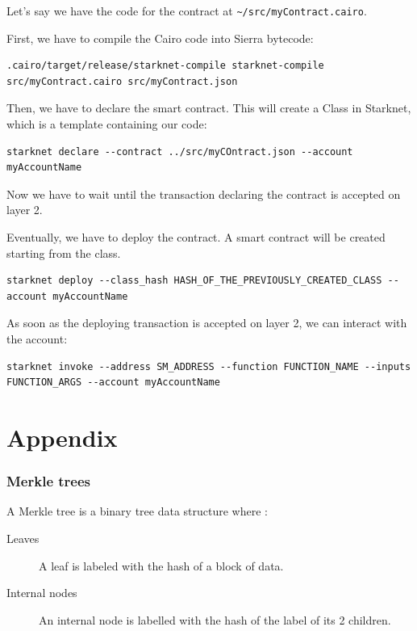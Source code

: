 \documentclass[11pt]{article}
\begin{document}
Let's say we have the code for the contract at \verb|~/src/myContract.cairo|.

First, we have to compile the Cairo code into Sierra bytecode:
\begin{lstlisting}[language=terminal]
    .cairo/target/release/starknet-compile starknet-compile src/myContract.cairo src/myContract.json
\end{lstlisting}

Then, we have to declare the smart contract. This will create a Class in Starknet, which is a template containing our code:
\begin{lstlisting}[language=terminal]
    starknet declare --contract ../src/myCOntract.json --account myAccountName
\end{lstlisting}

Now we have to wait until the transaction declaring the contract is accepted on layer 2.

Eventually, we have to deploy the contract. A smart contract will be created starting from the class.
\begin{lstlisting}[language=terminal]
    starknet deploy --class_hash HASH_OF_THE_PREVIOUSLY_CREATED_CLASS --account myAccountName
\end{lstlisting}

As soon as the deploying transaction is accepted on layer 2, we can interact with the account:
\begin{lstlisting}[language=terminal]
    starknet invoke --address SM_ADDRESS --function FUNCTION_NAME --inputs FUNCTION_ARGS --account myAccountName
\end{lstlisting}


\newpage
\part{Appendix} \label{part:appendix}
\section{Merkle trees} \label{section:merkle_trees}
A Merkle tree is a binary tree data structure where \cite{ethereum_merkle_trees}:
\begin{description}
    \item[Leaves] A leaf is labeled with the hash of a block of data.
    \item[Internal nodes] An internal node is labelled with the hash of the label of its 2 children.
\end{description}
\end{document}
